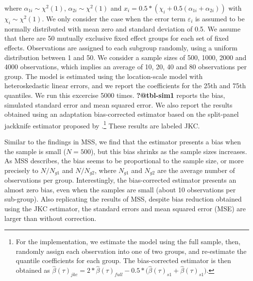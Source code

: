 \documentclass[
  authoryear,
  review,
  1p]{elsarticle}
\begin{document}
where \(\alpha_{1i}\sim \chi^2(1)\), \(\alpha_{2i} \sim \chi^2(1)\) and
\(x_i = 0.5 * (\chi_i +0.5(\alpha_{1i}+\alpha_{2i}))\) with
\(\chi_i \sim \chi^2(1)\). We only consider the case when the error term
\(\varepsilon_i\) is assumed to be normally distributed with mean zero
and standard deviation of 0.5. We assume that there are 50 mutually
exclusive fixed effect groups for each set of fixed effects.
Observations are assigned to each subgroup randomly, using a uniform
distribution between 1 and 50. We consider a sample sizes of 500, 1000,
2000 and 4000 observations, which implies an average of 10, 20, 40 and
80 observations per group. The model is estimated using the
location-scale model with heteroskedastic linear errors, and we report
the coefficients for the 25th and 75th quantiles. We run this excercise
5000 times. \textbf{?@tbl-sim1} reports the bias, simulated standard
error and mean squared error. We also report the results obtained using
an adaptation bias-corrected estimator based on the split-panel
jackknife estimator proposed by \citet{dhaene2015}.\footnote{For the
  implementation, we estimate the model using the full sample, then,
  randomly assign each observation into one of two groups, and
  re-estimate the quantile coefficients for each group. The
  bias-corrected estimator is then obtained as
  \(\hat\beta(\tau)_{jkc}=2*\hat\beta(\tau)_{full}-0.5*\big(\hat\beta(\tau)_{s1}+\hat\beta(\tau)_{s1}\big)\).}
These results are labeled JKC.

Similar to the findings in MSS, we find that the estimator presents a
bias when the sample is small (\(N=500\)), but this bias shrinks as the
sample sizes increases. As MSS describes, the bias seems to be
proportional to the sample size, or more precisely to \(N/N_{g1}\) and
\(N/N_{g2}\), where \(N_{g1}\) and \(N_{g2}\) are the average number of
observations per group. Interestingly, the bias-corrected estimator
presents an almost zero bias, even when the samples are small (about 10
observations per sub-group). Also replicating the results of MSS,
despite bias reduction obtained using the JKC estimator, the standard
errors and mean squared error (MSE) are larger than without correction.
\end{document}

